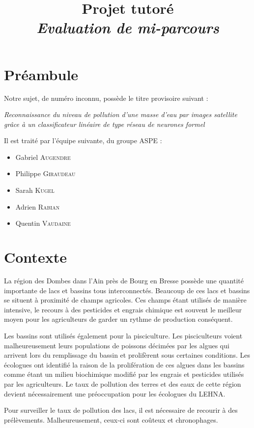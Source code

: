 \documentclass[a4paper, 12pt]{article}
\title{Projet tutoré \\ \small\textit{Evaluation de mi-parcours}}
\begin{document}
\maketitle

\section{Préambule}
Notre sujet, de numéro inconnu, possède le titre provisoire suivant :
\begin{center}
	\emph{\og Reconnaissance du niveau de pollution d’une masse d’eau par images satellite grâce à un classificateur linéaire de type réseau de neurones formel \fg}
\end{center}
Il est traité par l'équipe suivante, du groupe ASPE :
\vspace{0.3cm}
\begin{itemize}
	\item Gabriel \textsc{Augendre}
	\item Philippe \textsc{Giraudeau}
	\item Sarah \textsc{Kugel}
	\item Adrien \textsc{Rabian}
	\item Quentin \textsc{Vaudaine}
\end{itemize}

\section{Contexte}
La région des Dombes dans l'Ain près de Bourg en Bresse possède une quantité importante de lacs et bassins tous interconnectés. Beaucoup de ces lacs et bassins se situent à proximité de champs agricoles. Ces champs étant utilisés de manière intensive, le recours à des pesticides et engrais chimique est souvent le meilleur moyen pour les agriculteurs de garder un rythme de production conséquent.

Les bassins sont utilisés également pour la pisciculture. Les pisciculteurs voient malheureusement  leurs populations de poissons décimées par les algues qui arrivent lors du remplissage du bassin et prolifèrent sous certaines conditions. Les écologues ont identifié la raison de la prolifération de ces algues dans les bassins comme étant un milieu biochimique modifié par les engrais et pesticides utilisés par les agriculteurs. Le taux de pollution des terres et des eaux de cette région devient nécessairement une préoccupation pour les écologues du LEHNA.

Pour surveiller le taux de pollution des lacs, il est nécessaire de recourir à des prélèvements. Malheureusement, ceux-ci sont coûteux et chronophages.
\end{document}
